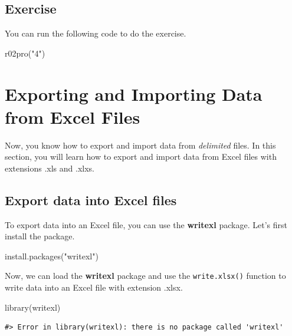 \documentclass[
]{book}
\newenvironment{Shaded}{\begin{snugshade}}{\end{snugshade}}
\newcommand{\FunctionTok}[1]{\textcolor[rgb]{0.00,0.00,0.00}{#1}}
\newcommand{\NormalTok}[1]{#1}
\newcommand{\StringTok}[1]{\textcolor[rgb]{0.31,0.60,0.02}{#1}}
\begin{document}
\hypertarget{exercise-9}{%
\subsection{Exercise}\label{exercise-9}}

You can run the following code to do the exercise.

\begin{Shaded}
\begin{Highlighting}[]
\FunctionTok{r02pro}\NormalTok{(}\StringTok{"4"}\NormalTok{)}
\end{Highlighting}
\end{Shaded}

\hypertarget{import-excel}{%
\section{Exporting and Importing Data from Excel Files}\label{import-excel}}

Now, you know how to export and import data from \emph{delimited} files. In this section, you will learn how to export and import data from Excel files with extensions .xls and .xlxs.

\hypertarget{export-data-into-excel-files}{%
\subsection{Export data into Excel files}\label{export-data-into-excel-files}}

To export data into an Excel file, you can use the \textbf{writexl} package. Let's first install the package.

\begin{Shaded}
\begin{Highlighting}[]
\FunctionTok{install.packages}\NormalTok{(}\StringTok{"writexl"}\NormalTok{)}
\end{Highlighting}
\end{Shaded}

Now, we can load the \textbf{writexl} package and use the \texttt{write.xlsx()} function to write data into an Excel file with extension .xlsx.

\begin{Shaded}
\begin{Highlighting}[]
\FunctionTok{library}\NormalTok{(writexl)}
\end{Highlighting}
\end{Shaded}

\begin{verbatim}
#> Error in library(writexl): there is no package called 'writexl'
\end{verbatim}
\end{document}

